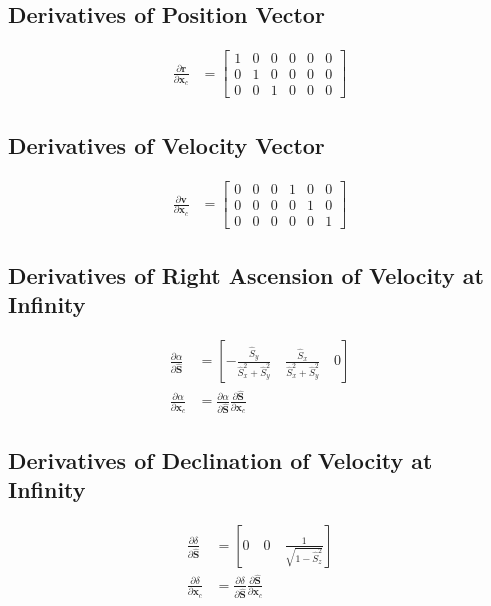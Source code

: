 \documentclass[]{article}
\newcommand{\vb}[1]{\bm{#1}} %
\newcommand{\vbh}[1]{\hat{\bm{#1}}} %
\newcommand{\pd}[2]{\frac{\partial #1}{\partial #2}} %
\newcommand{\xc}[0]{\vb{x}_c}
\begin{document}
\subsection{Derivatives of Position Vector}

\begin{align}
\pd{\vb{r}}{\xc} &= \left[ \begin{array}{cccccc}
1 & 0 & 0 & 0 & 0 & 0 \\
0 & 1 & 0 & 0 & 0 & 0 \\
0 & 0 & 1 & 0 & 0 & 0
\end{array} \right]
\end{align}

\subsection{Derivatives of Velocity Vector}

\begin{align}
\pd{\vb{v}}{\xc} &= \left[ \begin{array}{cccccc}
0 & 0 & 0 & 1 & 0 & 0 \\
0 & 0 & 0 & 0 & 1 & 0 \\
0 & 0 & 0 & 0 & 0 & 1
\end{array} \right]
\end{align}

\subsection{Derivatives of Right Ascension of Velocity at Infinity}

\begin{align}
	\pd{\alpha}{\vbh{S}} &= \left[ -\frac{\hat{S}_y}{\hat{S}_x^2 + \hat{S}_y^2} \quad \frac{\hat{S}_x}{\hat{S}_x^2 + \hat{S}_y^2} \quad  0 \right] \\
	\pd{\alpha}{\xc} &= \pd{\alpha}{\vbh{S}} \pd{\vbh{S}}{\xc}
\end{align}

\subsection{Derivatives of Declination of Velocity at Infinity}

\begin{align}
\pd{\delta}{\vbh{S}} &= \left[ 0 \quad 0 \quad \frac{1}{\sqrt{1 - \hat{S}_z^2}} \right] \\
\pd{\delta}{\xc} &= \pd{\delta}{\vbh{S}} \pd{\vbh{S}}{\xc}
\end{align}
\end{document}
